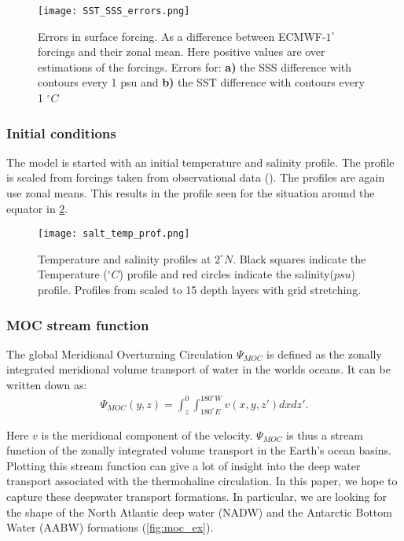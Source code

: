 \begin{figure}[H]
	\texttt{[image: SST\_SSS\_errors.png]}
	\caption{Errors in surface forcing. As a difference between ECMWF-$1^{\circ}$ forcings and their zonal mean.  Here positive values are over estimations of the forcings. Errors for: \textbf{a)} the SSS difference with contours every 1 psu and \textbf{b)} the SST difference with contours every 1 $^{\circ}C$}
	\label{fig:sss_sst_errors}
\end{figure}
\begin{multicols}{2}
 \subsubsection{Initial conditions}
The model is started with an initial temperature and salinity profile. The profile is scaled from forcings taken from observational data (\cite{ECMWFForc}). The profiles are again use zonal means. This results in the profile seen for the situation around the equator in \cref{fig:salt_temp_prf}.

\begin{figure}[H]
	\texttt{[image: salt\_temp\_prof.png]}
	\caption{Temperature and salinity profiles at $2^{\circ} N$. Black squares indicate the Temperature ($^{\circ}C$) profile and red circles indicate the salinity($psu$) profile. Profiles from \cite{ECMWFForc} scaled to 15 depth layers with grid stretching.}
	\label{fig:salt_temp_prf}
\end{figure}
 \newpage
\subsubsection{MOC stream function} \label{sec:MOCSTREAM}
The global Meridional Overturning Circulation $\Psi_{MOC}$ is defined as the zonally integrated meridional volume transport of water in the worlds oceans. It can be written down as:
\begin{align}
	\Psi_{MOC}(y,z) = \int_{z}^{0} \int_{180^{\circ}E}^{180^{\circ}W} v(x,y,z') dx dz'.
\end{align}

Here $v$ is the meridional component of the velocity.
$ \Psi_{MOC}$ is thus a stream function of the zonally integrated volume transport in the Earth's ocean basins. Plotting this stream function can give a lot of insight into the deep water transport associated with the thermohaline circulation. In this paper, we hope to capture these deepwater transport formations. In particular, we are looking for the shape of the North Atlantic deep water (NADW) and the Antarctic Bottom Water (AABW) formations (\cref{fig:moc_ex}).


\end{multicols}
